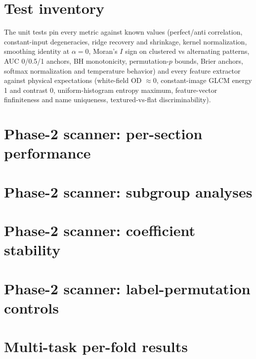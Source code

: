 \documentclass[11pt]{article}
\begin{document}
\section{Test inventory}

The \numTests{} unit tests pin every metric against known values (perfect/anti
correlation, constant-input degeneracies, ridge recovery and shrinkage, kernel
normalization, smoothing identity at $\alpha=0$, Moran's $I$ sign on clustered vs
alternating patterns, AUC 0/0.5/1 anchors, BH monotonicity, permutation-$p$ bounds,
Brier anchors, softmax normalization and temperature behavior) and every feature
extractor against physical expectations (white-field OD $\approx 0$, constant-image
GLCM energy 1 and contrast 0, uniform-histogram entropy maximum, feature-vector
finfiniteness and name uniqueness, textured-vs-flat discriminability).

\section{Phase-2 scanner: per-section performance}


\section{Phase-2 scanner: subgroup analyses}


\section{Phase-2 scanner: coefficient stability}


\section{Phase-2 scanner: label-permutation controls}


\section{Multi-task per-fold results}



















\end{document}
